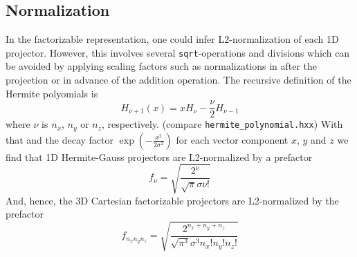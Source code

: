 \documentclass[oribibl]{llncs}
\newcommand{\ttt}[1]{\texttt{#1}}
\begin{document}
\subsection{Normalization}
In the factorizable representation, one could infer L2-normalization of each 1D projector. 
However, this involves several \ttt{sqrt}-operations and divisions which can be avoided
by applying scaling factors such as normalizations in
after the projection or in advance of the addition operation.
The recursive definition of the Hermite polyomials is
\begin{equation}
	H_{\nu + 1}(x) = x H_{\nu} - \frac{\nu}{2} H_{\nu - 1}
\end{equation}
where $\nu$ is $n_x$, $n_y$ or $n_z$, respectively.
(compare \ttt{hermite\_polynomial.hxx}) 
With that and the decay factor $\exp\left({-\frac{x^2}{2\sigma^2}}\right)$
for each vector component $x$, $y$ and $z$
we find that 1D Hermite-Gauss projectors are L2-normalized by a prefactor
\begin{equation}
	f_{\nu} = \sqrt{ \frac{2^{\nu}} {\sqrt{\pi} \sigma \nu!} }
\end{equation}
And, hence, the 3D Cartesian factorizable projectors are L2-normalized by the prefactor
\begin{equation}
	f_{n_x n_y n_z} = \sqrt{ \frac{2^{n_x + n_y + n_z}} {\sqrt{\pi^3} \sigma^3 n_x! n_y! n_z!} }
\end{equation}
\end{document}
